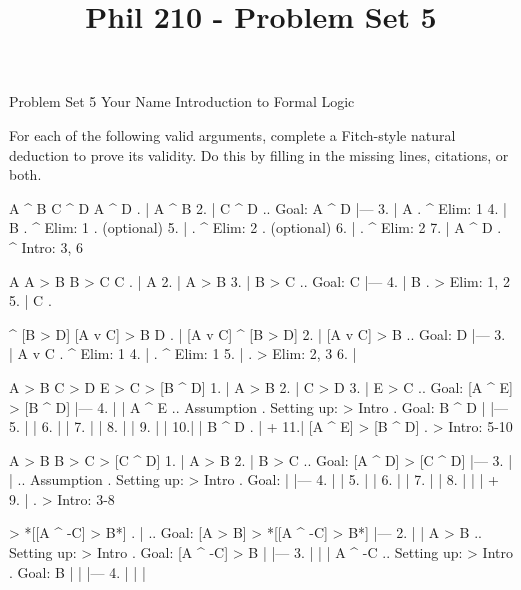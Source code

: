
\title{Phil 210 - Problem Set 5}

\heading
Problem Set 5
Your Name
Introduction to Formal Logic
\endheading

For each of the following valid arguments, complete a Fitch-style natural deduction to prove its validity. Do this by filling in the missing lines, citations, or both.

\problems
{}
\argument
 A ^ B
 C ^ D
\argumentline
 A ^ D
\endargument
	\answer
	. | A ^ B
	 2. | C ^ D  ..  Goal: A ^ D
	    |---
	 3. | A      .  ^ Elim: 1
	 4. | B      .  ^ Elim: 1  .  (optional)
	 5. |        .  ^ Elim: 2  .  (optional)
	 6. |        .  ^ Elim: 2
	 7. | A ^ D  .  ^ Intro: 3, 6
	\endfitchproof
	\endanswer

\argument
 A
 A > B
 B > C
\argumentline
 C
\endargument
	\answer
	. | A
	 2. | A > B
	 3. | B > C  ..  Goal: C
	    |---
	 4. | B      .  > Elim: 1, 2
	 5. | C      .  
	\endfitchproof
	\endanswer

\argument
 [A v C] ^ [B > D]
 [A v C] > B
\argumentline
 D
\endargument
	\answer
	. | [A v C] ^ [B > D]
	 2. | [A v C] > B        ..  Goal: D
	    |---
	 3. | A v C              .  ^ Elim: 1
	 4. |                    .  ^ Elim: 1
	 5. |                    .  > Elim: 2, 3
	 6. | 
	\endfitchproof
	\endanswer

\argument
 A > B
 C > D
 E > C
\argumentline
 [A ^ E] > [B ^ D]
\endargument
	\answer
	\fitchproofindentby{-4\fitchspace}
	 1. | A > B
	 2. | C > D
	 3. | E > C      ..  Goal: [A ^ E] > [B ^ D]
	    |---
	 4. |   | A ^ E  ..  Assumption  .  Setting up: > Intro  .  Goal: B ^ D
	    |   |---
	 5. |   | 
	 6. |   | 
	 7. |   | 
	 8. |   | 
	 9. |   | 
	 10.|   | B ^ D   .  
	    |   +
	 11.| [A ^ E] > [B ^ D]  .  > Intro: 5-10
	\endfitchproof
	\endanswer

\argument
 A > B
 B > C
\argumentline
 [A ^ D] > [C ^ D]
\endargument
	\answer
	\fitchproofindentby{-4\fitchspace}
	 1. | A > B
	 2. | B > C      ..  Goal: [A ^ D] > [C ^ D]
	    |---
	 3. |   |        ..  Assumption  .  Setting up: > Intro  .  Goal: 
	    |   |---
	 4. |   | 
	 5. |   | 
	 6. |   | 
	 7. |   | 
	 8. |   | 
	    |   +
	 9. |            .  > Intro: 3-8
	\endfitchproof
	\endanswer

\argument
\argumentline
 [A > B] > *[[A ^ -C] > B*]
\endargument
	\answer
	. |                 ..  Goal: [A > B] > *[[A ^ -C] > B*]
	    |---
	 2. |   | A > B       ..  Setting up: > Intro  .  Goal: [A ^ -C] > B
	    |   |---
	 3. |   |   | A ^ -C  ..  Setting up: > Intro  .  Goal: B
	    |   |   |---
	 4. |   |   | 
	\endfitchproof
	\endanswer

\endproblems
\bye
